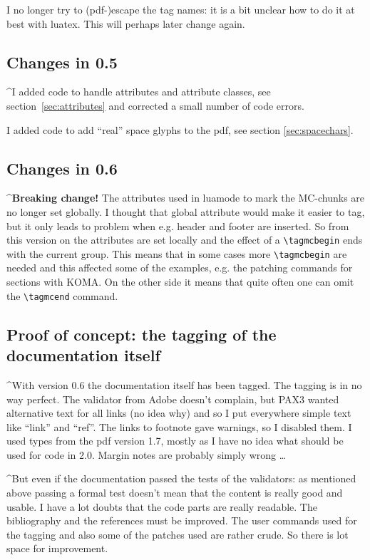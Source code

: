\documentclass[DIV=12,parskip=half-,bibliography=totoc]{scrartcl}
\begin{document}
\TagP
I no longer try to (pdf-)escape the tag names: it is a bit unclear how to do it at best with luatex. This will perhaps later change again.\TagPend

\subsection{Changes in 0.5}
\TagP^I added code to handle attributes and attribute classes, see section~\ref{sec:attributes} and corrected a small number of code errors.

\TagP I added code to add \enquote{real} space glyphs to the pdf, see section \ref{sec:spacechars}.\TagPend


\subsection{Changes in 0.6}

\TagP^\textbf{Breaking change!} The attributes used in luamode to mark the MC-chunks are no longer set globally. I thought that global attribute would make it easier to tag, but it only leads to problem when e.g. header and footer are inserted. So from this version on the attributes are set locally and the effect of a \verb+\tagmcbegin+ ends with the current group. This means that in some cases more \verb+\tagmcbegin+ are needed and  this affected some of the examples, e.g. the patching commands for sections with KOMA. On the other side it means that quite often one can omit the \verb+\tagmcend+ command.\TagPend

\subsection{Proof of concept: the tagging of the documentation itself}
\TagP^With version 0.6 the documentation itself has been tagged. The tagging is in no way perfect. The validator from Adobe doesn't complain, but PAX3 wanted alternative text for all links (no idea why) and so I put everywhere simple text like \enquote{link} and \enquote{ref}. The links to footnote gave warnings, so I disabled them. I used types from the pdf version 1.7, mostly as I have no idea what should be used for code in 2.0. Margin notes are probably simply wrong \ldots\TagPend

\TagP^But even if the documentation passed the tests of the validators:  as mentioned above passing a formal test doesn't mean that the content is really good and usable. I have a lot doubts that the code parts are really readable. The bibliography and the references must be improved. The user commands used for the tagging and also some of the patches used are rather crude. So there is lot space for improvement.\TagPend
\end{document}
